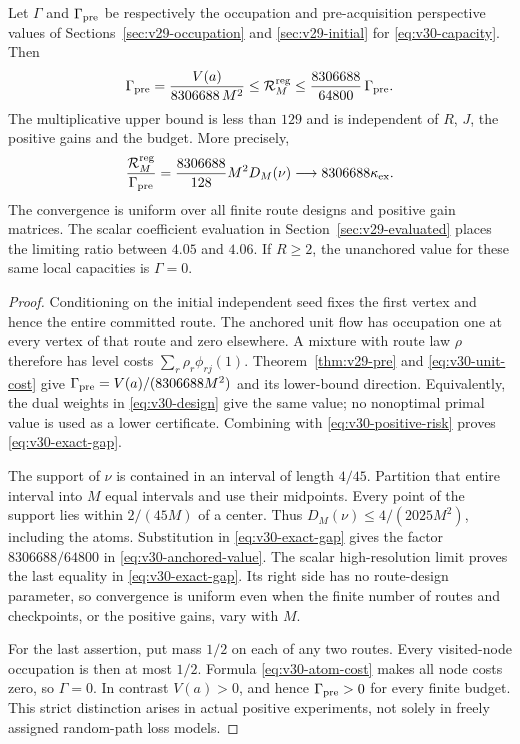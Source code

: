 \begin{theorem}
\label{thm:v30-controlled-gap}
Let $\Gamma$ and $\Gamma_{\rm pre}$ be respectively the occupation
and pre-acquisition perspective values of
Sections~\ref{sec:v29-occupation} and \ref{sec:v29-initial} for
\eqref{eq:v30-capacity}. Then
\begin{equation}\label{eq:v30-anchored-value}
 \Gamma_{\rm pre}
       =\frac{V(a)}{8306688\,M^2}
       \le\mathcal R_M^{\rm reg}
       \le\frac{8306688}{64800}\,\Gamma_{\rm pre}.
\end{equation}
The multiplicative upper bound is less than $129$ and is independent
of $R$, $J$, the positive gains and the budget. More precisely,
\begin{equation}\label{eq:v30-exact-gap}
 \frac{\mathcal R_M^{\rm reg}}{\Gamma_{\rm pre}}
            =\frac{8306688}{128}M^2D_M(\nu)
       \longrightarrow 8306688\kappa_{\rm ex}.
\end{equation}
The convergence is uniform over all finite route designs and positive
gain matrices. The scalar coefficient evaluation in
Section~\ref{sec:v29-evaluated} places the limiting ratio between
$4.05$ and $4.06$. If $R\ge2$, the unanchored value for these same
local capacities is $\Gamma=0$.
\end{theorem}
\begin{proof}
Conditioning on the initial independent seed fixes the first vertex
and hence the entire committed route. The anchored unit flow has
occupation one at every vertex of that route and zero elsewhere.
A mixture with route law $\rho$ therefore has level costs
$\sum_r\rho_r\phi_{rj}(1)$. Theorem~\ref{thm:v29-pre} and
\eqref{eq:v30-unit-cost} give
$\Gamma_{\rm pre}=V(a)/(8306688M^2)$ and its lower-bound direction.
Equivalently, the dual weights in \eqref{eq:v30-design} give the same
value; no nonoptimal primal value is used as a lower certificate.
Combining with \eqref{eq:v30-positive-risk} proves
\eqref{eq:v30-exact-gap}.

The support of $\nu$ is contained in an interval of length $4/45$.
Partition that entire interval into $M$ equal intervals and use their
midpoints. Every point of the support lies within $2/(45M)$ of a
center. Thus $D_M(\nu)\le4/(2025M^2)$, including the atoms.
Substitution in \eqref{eq:v30-exact-gap} gives the factor
$8306688/64800$ in \eqref{eq:v30-anchored-value}. The scalar
high-resolution limit proves the last equality in
\eqref{eq:v30-exact-gap}. Its right side has no route-design parameter,
so convergence is uniform even when the finite number of routes and
checkpoints, or the positive gains, vary with $M$.

For the last assertion, put mass $1/2$ on each of any two routes.
Every visited-node occupation is then at most $1/2$. Formula
\eqref{eq:v30-atom-cost} makes all node costs zero, so $\Gamma=0$.
In contrast $V(a)>0$, and hence $\Gamma_{\rm pre}>0$ for every finite
budget. This strict distinction arises in actual positive experiments,
not solely in freely assigned random-path loss models.
\end{proof}

